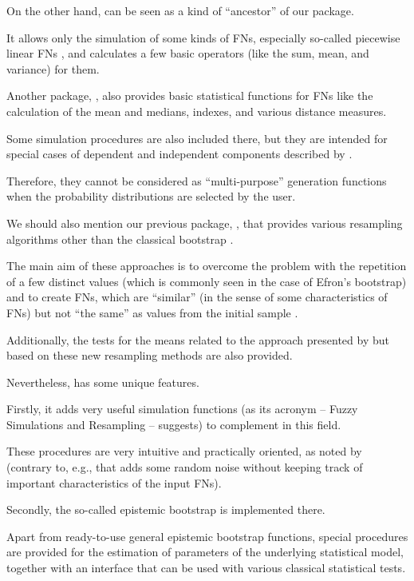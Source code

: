 On the other hand,  \citep{SimPLFNMan} can be seen as a kind of ``ancestor'' of our package.

It allows only the simulation of some kinds of FNs, especially so-called piecewise linear FNs \citep{COROIANU201326}, and calculates a few basic operators (like the sum, mean, and variance) for them.

Another package,  \citep{FuzzyStatTraMan}, also provides basic statistical functions for FNs like the calculation of the mean and medians, indexes, and various distance measures.

Some simulation procedures are also included there, but they are intended for special cases of dependent and independent components described by \cite{7295579}.

Therefore, they cannot be considered as ``multi-purpose'' generation functions when the probability distributions are selected by the user.

We should also mention our previous package,  \citep{FuzzyResampling}, that provides various resampling algorithms other than the classical bootstrap \citep{fuzzyResamplingArt}.

The main aim of these approaches is to overcome the problem with the repetition of a few distinct values (which is commonly seen in the case of Efron's bootstrap) and to create FNs, which are ``similar'' (in the sense of some characteristics of FNs) but not ``the same'' as values from the initial sample \citep{grzegorzewski_amcs2020,romaniuk_hryniewicz,GrzegorzewskiRom2021}.

Additionally, the tests for the means related to the approach presented by \cite{LUBIANO2016918} but based on these new resampling methods are also provided.

Nevertheless,  has some unique features.

Firstly, it adds very useful simulation functions (as its acronym -- Fuzzy Simulations and Resampling -- suggests) to complement  in this field.

These procedures are very intuitive and practically oriented, as noted by \cite{FRV} (contrary to, e.g.,  that adds some random noise without keeping track of important characteristics of the input FNs).

Secondly, the so-called epistemic bootstrap is implemented there.

Apart from ready-to-use general epistemic bootstrap functions, special procedures are provided for the estimation of parameters of the underlying statistical model, together with an interface that can be used with various classical statistical tests.

